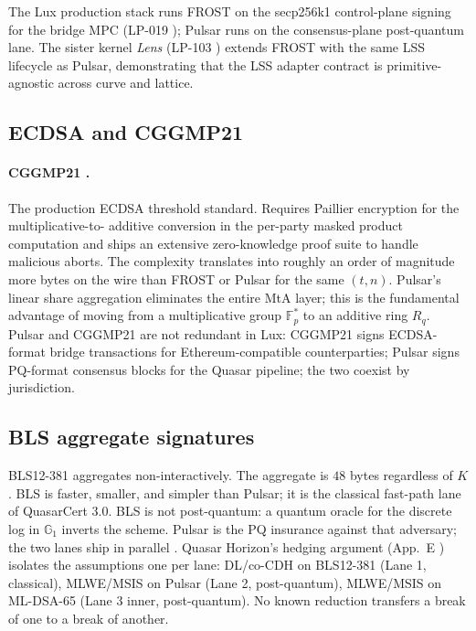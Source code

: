 The Lux production stack runs FROST on the secp256k1 control-plane
signing for the bridge MPC (LP-019 \cite{lp019}); Pulsar runs on the
consensus-plane post-quantum lane. The sister kernel \emph{Lens}
(LP-103 \cite{lp103}) extends FROST with the same LSS lifecycle as
Pulsar, demonstrating that the LSS adapter contract is
primitive-agnostic across curve and lattice.

\subsection{ECDSA and CGGMP21}
\label{sec:related:ecdsa}

\paragraph{CGGMP21 \cite{cggmp21}.} The production ECDSA threshold
standard. Requires Paillier encryption for the multiplicative-to-
additive conversion in the per-party masked product computation and
ships an extensive zero-knowledge proof suite to handle malicious
aborts. The complexity translates into roughly an order of magnitude
more bytes on the wire than FROST or Pulsar for the same $(t, n)$.
Pulsar's linear share aggregation eliminates the entire MtA layer;
this is the fundamental advantage of moving from a multiplicative
group $\mathbb{F}_p^*$ to an additive ring $R_q$. Pulsar and CGGMP21
are not redundant in Lux: CGGMP21 signs ECDSA-format bridge
transactions for Ethereum-compatible counterparties; Pulsar signs
PQ-format consensus blocks for the Quasar pipeline; the two coexist by
jurisdiction.

\subsection{BLS aggregate signatures}
\label{sec:related:bls}

BLS12-381 \cite{bls,lp075} aggregates non-interactively. The aggregate
is $48$ bytes regardless of $K$. BLS is faster, smaller, and simpler
than Pulsar; it is the classical fast-path lane of QuasarCert 3.0.
BLS is not post-quantum: a quantum oracle for the discrete log in
$\mathbb{G}_1$ inverts the scheme. Pulsar is the PQ insurance against
that adversary; the two lanes ship in parallel \cite{lp020}.
Quasar Horizon's hedging argument (App.~E \cite{quasarcertsoundness})
isolates the assumptions one per lane: DL/co-CDH on BLS12-381 (Lane 1,
classical), MLWE/MSIS on Pulsar (Lane 2, post-quantum), MLWE/MSIS on
ML-DSA-65 (Lane 3 inner, post-quantum). No known reduction transfers
a break of one to a break of another.

